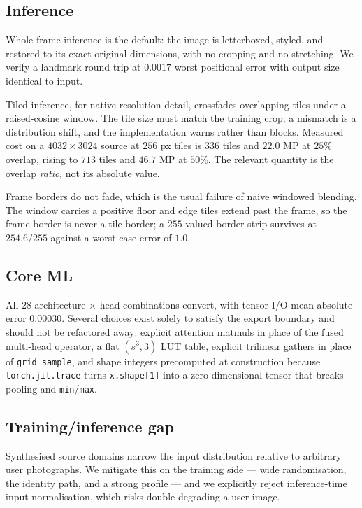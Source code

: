 \documentclass[11pt,a4paper]{article}
\newcommand{\code}[1]{\texttt{#1}}
\begin{document}
\subsection{Inference}

Whole-frame inference is the default: the image is letterboxed, styled, and
restored to its exact original dimensions, with no cropping and no stretching.
We verify a landmark round trip at $0.0017$ worst positional error with output
size identical to input.

Tiled inference, for native-resolution detail, crossfades overlapping tiles under
a raised-cosine window. The tile size must match the training crop; a mismatch is
a distribution shift, and the implementation warns rather than blocks. Measured
cost on a $4032\times3024$ source at $256$ px tiles is $336$ tiles and $22.0$ MP
at $25\%$ overlap, rising to $713$ tiles and $46.7$ MP at $50\%$. The relevant
quantity is the overlap \emph{ratio}, not its absolute value.

Frame borders do not fade, which is the usual failure of naive windowed blending.
The window carries a positive floor and edge tiles extend past the frame, so the
frame border is never a tile border; a $255$-valued border strip survives at
$254.6/255$ against a worst-case error of $1.0$.

\subsection{Core ML}

All $28$ architecture $\times$ head combinations convert, with tensor-I/O mean
absolute error $0.00030$. Several choices exist solely to satisfy the export
boundary and should not be refactored away: explicit attention matmuls in place
of the fused multi-head operator, a flat $(s^3, 3)$ LUT table, explicit trilinear
gathers in place of \code{grid\_sample}, and shape integers precomputed at
construction because \code{torch.jit.trace} turns \code{x.shape[1]} into a
zero-dimensional tensor that breaks pooling and \code{min}/\code{max}.

\subsection{Training/inference gap}

Synthesised source domains narrow the input distribution relative to arbitrary
user photographs. We mitigate this on the training side --- wide randomisation,
the identity path, and a strong profile --- and we explicitly reject
inference-time input normalisation, which risks double-degrading a user image.
\end{document}

